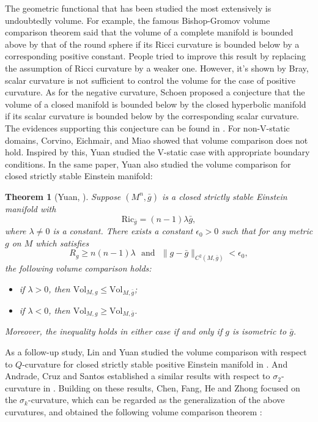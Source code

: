 \documentclass[12pt]{amsart}
\newtheorem{theor}{Theorem}[section]
\newcommand{\bg}{\bar{g}}
\numberwithin{equation}{section}
\begin{document}
The geometric functional that has been studied the most extensively is undoubtedly volume. For example, the famous Bishop-Gromov volume comparison theorem said that the volume of a complete manifold is bounded above by that of the round sphere if its Ricci curvature is bounded below by a corresponding positive constant. People tried to improve this result by replacing the assumption of Ricci curvature by a weaker one. However, it's shown by Bray\cite{Brayphd}, scalar curvature is not sufficient to control the volume for the case of positive curvature. As for the negative curvature, Schoen\cite{Schoen} proposed a conjecture that the volume of a closed manifold is bounded below by the closed hyperbolic manifold if its scalar curvature is bounded below by the corresponding scalar curvature. The evidences supporting this conjecture can be found in \cite{Besson-C-G1,Besson-C-G2,Hamilton,Perelman1,Perelman2}. For non-V-static domains, Corvino, Eichmair, and Miao\cite{Miao} showed that volume comparison does not hold. Inspired by this, Yuan\cite{Yuan_VolumeCW} studied the V-static case with appropriate boundary conditions. In the same paper, Yuan also studied the volume comparison for closed strictly stable Einstein manifold:
\begin{theor}[Yuan, \cite{Yuan_VolumeCW}]\label{theorem: Yuan}
    Suppose $(M^n,\bg)$ is a closed strictly stable Einstein manifold with\begin{equation*}
        \mathrm{Ric}_{\bg}=(n-1)\lambda\bg,
    \end{equation*}
    where $\lambda\neq0$ is a constant. There exists a constant $\epsilon_0>0$ such that for any metric $g$ on $M$ which satisfies\begin{equation*}
        R_g\geq n(n-1)\lambda\ \ \ \mathrm{and}\ \ \ \|g-\bg\|_{C^2(M,\bg)}<\epsilon_0,
    \end{equation*}
    the following volume comparison holds:
    \begin{itemize}
        \item if $\lambda>0$, then $\mathrm{Vol}_{M,g} \leq \mathrm{Vol}_{M,\bg}$;
        \item if $\lambda<0$, then $\mathrm{Vol}_{M,g} \geq \mathrm{Vol}_{M,\bg}$.
    \end{itemize}
    Moreover, the inequality holds in either case if and only if $g$ is isometric to $\bg$.
\end{theor}
As a follow-up study, Lin and Yuan studied the volume comparison with respect to $Q$-curvature for closed strictly stable positive Einstein manifold in \cite{Yuan_Q2}. And Andrade, Cruz and Santos established a similar results with respect to $\sigma_2$-curvature in \cite{sigma2}. Building on these results, Chen, Fang, He and Zhong focused on the $\sigma_k$-curvature, which can be regarded as the generalization of the above curvatures, and obtained the following volume comparison theorem \cite{2025Volume}:
\end{document}
